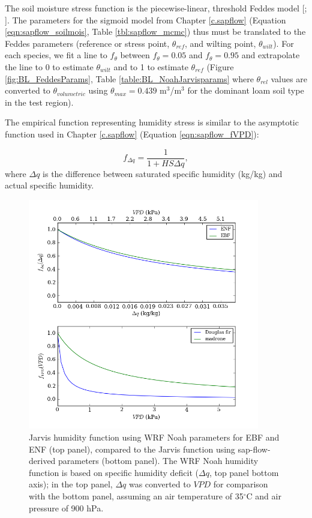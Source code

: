 The soil moisture stress function is the piecewise-linear, threshold Feddes model [\cite{feddes}; \cite{chen2008observations}].  The parameters for the sigmoid model from Chapter \ref{c.sapflow} (Equation \ref{eqn:sapflow_soilmois}, Table \ref{tbl:sapflow_mcmc}) thus must be translated to the Feddes parameters (reference or stress point, $\theta_{ref}$, and wilting point, $\theta_{wilt}$).  For each species, we fit a line to $f_{\theta}$ between $f_{\theta}=0.05$ and $f_{\theta}=0.95$ and extrapolate the line to 0 to estimate $\theta_{wilt}$ and to 1 to estimate $\theta_{ref}$ (Figure \ref{fig:BL_FeddesParams}, Table \ref{table:BL_NoahJarvisparams} where $\theta_{rel}$ values are converted to $\theta_{volumetric}$ using $\theta_{max} = 0.439$ m$^3$/m$^3$ for the dominant loam soil type in the test region).


The empirical function representing humidity stress is similar to the asymptotic function used in Chapter \ref{c.sapflow} (Equation \ref{eqn:sapflow_fVPD}):

\begin{equation}
f_{\Delta q} = \frac{1}{1+HS \Delta q},
\label{eqn:BL_WRFq}
\end{equation}
where $\Delta q$ is the difference between saturated specific humidity (kg/kg) and actual specific humidity.

\begin{figure}[here]
\includegraphics[width=0.9\textwidth]{ch2-BL/figures/humidity_functions.png}
\caption{Jarvis humidity function using WRF Noah parameters for EBF and ENF (top panel), compared to the Jarvis function using sap-flow-derived parameters (bottom panel).  The WRF Noah humidity function is based on specific humidity deficit ($\Delta q$, top panel bottom axis); in the top panel, $\Delta q$ was converted to $VPD$ for comparison with the bottom panel, assuming an air temperature of 35$^\circ$C and air pressure of 900 hPa.}
\label{fig:BL_humidity}
\end{figure}

